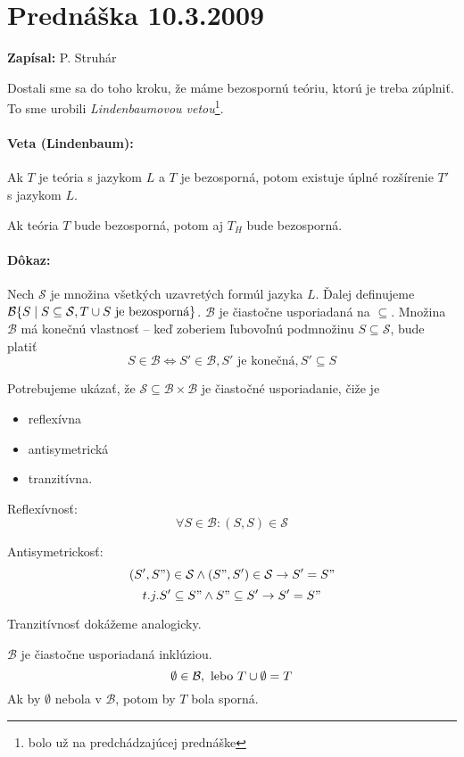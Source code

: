 \section{Prednáška 10.3.2009}

\par\textbf{Zapísal:} P. Struhár

\par Dostali sme sa do toho  kroku, že máme bezospornú teóriu, ktorú je treba zúplniť.
To sme urobili \emph{Lindenbaumovou vetou}\footnote{bolo už na predchádzajúcej prednáške}.

\paragraph{Veta (Lindenbaum):} Ak $T$ je teória s jazykom $L$ a $T$ je
bezosporná, potom existuje úplné rozšírenie $T'$ s jazykom $L$.

Ak teória $T$ bude bezosporná, potom aj $T_H$ bude bezosporná.

\paragraph{Dôkaz:} Nech $\mathcal{S}$ je množina všetkých uzavretých formúl jazyka $L$.
Ďalej definujeme $\mathcal{B} \{ S \mid S \subseteq \mathcal{S}, T \union S
\mbox{ je bezosporná}\}$. $\mathcal{B}$ je čiastočne usporiadaná na $\subseteq$.
Množina $\mathcal{B}$ má konečnú vlastnosť -- keď zoberiem ľubovoľnú podmnožinu
$S \subseteq \mathcal{S}$, bude platiť $$ S \in \mathcal{B} \iff S' \in
\mathcal{B}, S' \mbox{ je konečná}, S' \subseteq S$$

 Potrebujeme ukázať, že $\mathcal{S} \subseteq \mathcal{B}\times\mathcal{B}$ je čiastočné usporiadanie, čiže je

\begin{itemize}
\item reflexívna
\item antisymetrická
\item tranzitívna.
\end{itemize}

Reflexívnosť:
$$ \forall S \in \mathcal{B}: (S,S) \in \mathcal{S}$$

Antisymetrickosť:
$$ (S',S") \in \mathcal{S} \land (S",S') \in \mathcal{S} \implies S' = S"$$
$$ t.j. S' \subseteq S" \land S" \subseteq S' \implies S' = S"$$

Tranzitívnosť dokážeme analogicky.

$\mathcal{B}$ je čiastočne usporiadaná inklúziou.
$$\emptyset \in \mathcal{B}, \mbox{ lebo } T \union \emptyset = T$$
Ak by $\emptyset$ nebola v $\mathcal{B}$, potom by $T$ bola sporná.

